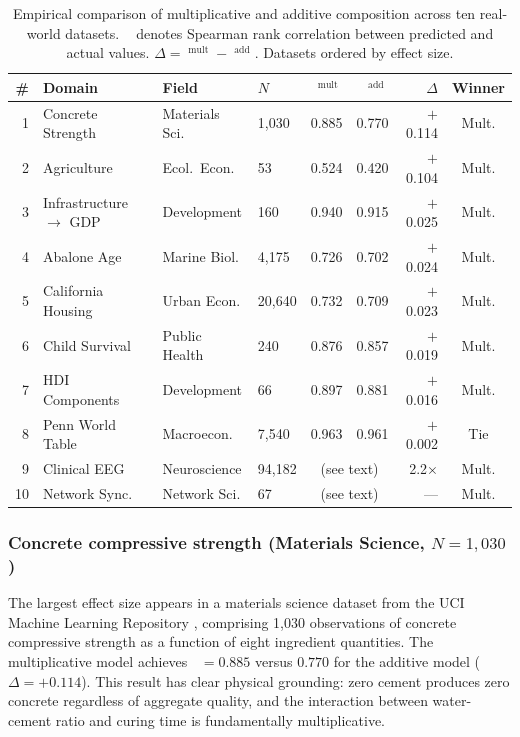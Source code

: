 \documentclass[12pt, a4paper]{article}
\theoremstyle{definition}
\theoremstyle{remark}
\DeclareMathOperator{\Spearman}{\rho_s}
\begin{document}
\begin{table}[H]
\centering
\caption{Empirical comparison of multiplicative and additive composition across ten real-world datasets. $\Spearman$ denotes Spearman rank correlation between predicted and actual values. $\Delta = \Spearman^{\text{mult}} - \Spearman^{\text{add}}$. Datasets ordered by effect size.}\label{tab:results}
\smallskip
\begin{tabular}{@{}rlllrrrc@{}}
\toprule
\# & Domain & Field & $N$ & $\Spearman^{\text{mult}}$ & $\Spearman^{\text{add}}$ & $\Delta$ & Winner \\
\midrule
1 & Concrete Strength & Materials Sci. & 1{,}030 & 0.885 & 0.770 & $+$0.114 & Mult. \\
2 & Agriculture & Ecol.\ Econ. & 53 & 0.524 & 0.420 & $+$0.104 & Mult. \\
3 & Infrastructure $\to$ GDP & Development & 160 & 0.940 & 0.915 & $+$0.025 & Mult. \\
4 & Abalone Age & Marine Biol. & 4{,}175 & 0.726 & 0.702 & $+$0.024 & Mult. \\
5 & California Housing & Urban Econ. & 20{,}640 & 0.732 & 0.709 & $+$0.023 & Mult. \\
6 & Child Survival & Public Health & 240 & 0.876 & 0.857 & $+$0.019 & Mult. \\
7 & HDI Components & Development & 66 & 0.897 & 0.881 & $+$0.016 & Mult. \\
8 & Penn World Table & Macroecon. & 7{,}540 & 0.963 & 0.961 & $+$0.002 & Tie \\
\midrule
9 & Clinical EEG & Neuroscience & 94{,}182 & \multicolumn{2}{c}{(see text)} & 2.2$\times$ & Mult. \\
10 & Network Sync. & Network Sci. & 67 & \multicolumn{2}{c}{(see text)} & --- & Mult. \\
\bottomrule
\end{tabular}
\end{table}

\subsubsection{Concrete compressive strength (Materials Science, $N = 1{,}030$)}

The largest effect size appears in a materials science dataset from the UCI Machine Learning Repository \cite{yeh1998}, comprising 1,030 observations of concrete compressive strength as a function of eight ingredient quantities. The multiplicative model achieves $\Spearman = 0.885$ versus $0.770$ for the additive model ($\Delta = +0.114$). This result has clear physical grounding: zero cement produces zero concrete regardless of aggregate quality, and the interaction between water-cement ratio and curing time is fundamentally multiplicative.
\end{document}
